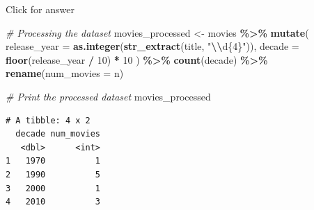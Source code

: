 \documentclass[
]{book}
\newenvironment{Shaded}{\begin{snugshade}}{\end{snugshade}}
\newcommand{\AttributeTok}[1]{\textcolor[rgb]{0.13,0.29,0.53}{#1}}
\newcommand{\CommentTok}[1]{\textcolor[rgb]{0.56,0.35,0.01}{\textit{#1}}}
\newcommand{\DecValTok}[1]{\textcolor[rgb]{0.00,0.00,0.81}{#1}}
\newcommand{\FunctionTok}[1]{\textcolor[rgb]{0.13,0.29,0.53}{\textbf{#1}}}
\newcommand{\NormalTok}[1]{#1}
\newcommand{\OtherTok}[1]{\textcolor[rgb]{0.56,0.35,0.01}{#1}}
\newcommand{\SpecialCharTok}[1]{\textcolor[rgb]{0.81,0.36,0.00}{\textbf{#1}}}
\newcommand{\StringTok}[1]{\textcolor[rgb]{0.31,0.60,0.02}{#1}}
\begin{document}
Click for answer

\begin{Shaded}
\begin{Highlighting}[]
\CommentTok{\# Processing the dataset}
\NormalTok{movies\_processed }\OtherTok{\textless{}{-}}\NormalTok{ movies }\SpecialCharTok{\%\textgreater{}\%}
  \FunctionTok{mutate}\NormalTok{(}
    \AttributeTok{release\_year =} \FunctionTok{as.integer}\NormalTok{(}\FunctionTok{str\_extract}\NormalTok{(title, }\StringTok{"}\SpecialCharTok{\textbackslash{}\textbackslash{}}\StringTok{d\{4\}"}\NormalTok{)),}
    \AttributeTok{decade =} \FunctionTok{floor}\NormalTok{(release\_year }\SpecialCharTok{/} \DecValTok{10}\NormalTok{) }\SpecialCharTok{*} \DecValTok{10}
\NormalTok{  ) }\SpecialCharTok{\%\textgreater{}\%}
  \FunctionTok{count}\NormalTok{(decade) }\SpecialCharTok{\%\textgreater{}\%}
  \FunctionTok{rename}\NormalTok{(}\AttributeTok{num\_movies =}\NormalTok{ n)}

\CommentTok{\# Print the processed dataset}
\NormalTok{movies\_processed}
\end{Highlighting}
\end{Shaded}

\begin{verbatim}
# A tibble: 4 x 2
  decade num_movies
   <dbl>      <int>
1   1970          1
2   1990          5
3   2000          1
4   2010          3
\end{verbatim}

  
\end{document}
